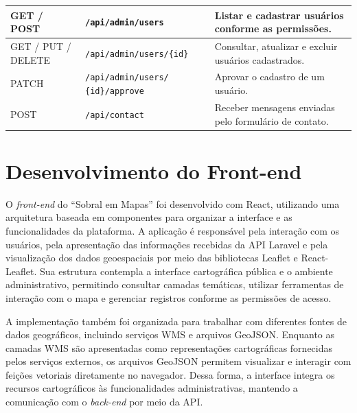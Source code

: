 \begin{table}[!htbp]
{\begin{tabular}{
            >{\raggedright\arraybackslash}p{2.7cm}
            >{\raggedright\arraybackslash}p{5.0cm}
            >{\raggedright\arraybackslash}p{6.3cm}
        }
            GET / POST &
            \texttt{/api/admin/users} &
            Listar e cadastrar usuários conforme as permissões. \\
            \midrule

            GET / PUT / DELETE &
            \texttt{/api/admin/users/\{id\}} &
            Consultar, atualizar e excluir usuários cadastrados. \\
            \midrule

            PATCH &
            \texttt{/api/admin/users/}\newline
            \texttt{\{id\}/approve} &
            Aprovar o cadastro de um usuário. \\
            \midrule

            POST &
            \texttt{/api/contact} &
            Receber mensagens enviadas pelo formulário de contato. \\

            \bottomrule
        \end{tabular}
    }{
    }
\end{table}


\FloatBarrier
\section{Desenvolvimento do Front-end}
\label{sec:desenvolvimento-frontend}

O \textit{front-end} do ``Sobral em Mapas'' foi desenvolvido com React, utilizando uma arquitetura baseada em componentes para organizar a interface e as funcionalidades da plataforma. A aplicação é responsável pela interação com os usuários, pela apresentação das informações recebidas da API Laravel e pela visualização dos dados geoespaciais por meio das bibliotecas Leaflet e React-Leaflet. Sua estrutura contempla a interface cartográfica pública e o ambiente administrativo, permitindo consultar camadas temáticas, utilizar ferramentas de interação com o mapa e gerenciar registros conforme as permissões de acesso.

A implementação também foi organizada para trabalhar com diferentes fontes de dados geográficos, incluindo serviços WMS e arquivos GeoJSON. Enquanto as camadas WMS são apresentadas como representações cartográficas fornecidas pelos serviços externos, os arquivos GeoJSON permitem visualizar e interagir com feições vetoriais diretamente no navegador. Dessa forma, a interface integra os recursos cartográficos às funcionalidades administrativas, mantendo a comunicação com o \textit{back-end} por meio da API.

